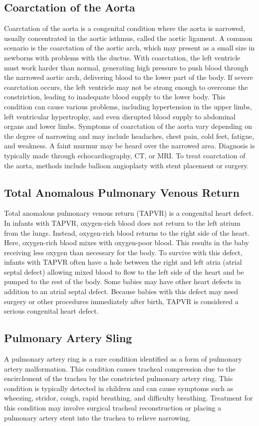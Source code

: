 \documentclass{article}
\begin{document}
\subsection{Coarctation of the Aorta}
Coarctation of the aorta is a congenital condition where the aorta is narrowed, usually concentrated in the aortic isthmus, called the aortic ligament. A common scenario is the coarctation of the aortic arch, which may present as a small size in newborns with problems with the ductus. With coarctation, the left ventricle must work harder than normal, generating high pressure to push blood through the narrowed aortic arch, delivering blood to the lower part of the body. If severe coarctation occurs, the left ventricle may not be strong enough to overcome the constriction, leading to inadequate blood supply to the lower body. This condition can cause various problems, including hypertension in the upper limbs, left ventricular hypertrophy, and even disrupted blood supply to abdominal organs and lower limbs. Symptoms of coarctation of the aorta vary depending on the degree of narrowing and may include headaches, chest pain, cold feet, fatigue, and weakness. A faint murmur may be heard over the narrowed area. Diagnosis is typically made through echocardiography, CT, or MRI. To treat coarctation of the aorta, methods include balloon angioplasty with stent placement or surgery.

\subsection{Total Anomalous Pulmonary Venous Return}
Total anomalous pulmonary venous return (TAPVR) is a congenital heart defect. In infants with TAPVR, oxygen-rich blood does not return to the left atrium from the lungs. Instead, oxygen-rich blood returns to the right side of the heart. Here, oxygen-rich blood mixes with oxygen-poor blood. This results in the baby receiving less oxygen than necessary for the body. To survive with this defect, infants with TAPVR often have a hole between the right and left atria (atrial septal defect) allowing mixed blood to flow to the left side of the heart and be pumped to the rest of the body. Some babies may have other heart defects in addition to an atrial septal defect. Because babies with this defect may need surgery or other procedures immediately after birth, TAPVR is considered a serious congenital heart defect.

\subsection{Pulmonary Artery Sling}
A pulmonary artery ring is a rare condition identified as a form of pulmonary artery malformation. This condition causes tracheal compression due to the encirclement of the trachea by the constricted pulmonary artery ring. This condition is typically detected in children and can cause symptoms such as wheezing, stridor, cough, rapid breathing, and difficulty breathing. Treatment for this condition may involve surgical tracheal reconstruction or placing a pulmonary artery stent into the trachea to relieve narrowing.
\end{document}

